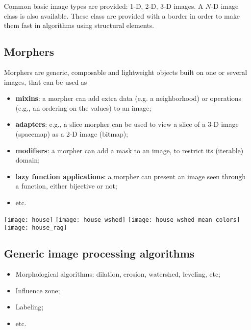 \documentclass{article}
\begin{document}
Common basic image types are provided: 1-D, 2-D, 3-D images.
A $N$-D image class is also available.
These class are provided with a border in order to make them fast in algorithms
using structural elements.

\subsection{Morphers}

Morphers are generic, composable and lightweight objects built on one or several
images, that can be used as
\begin{itemize}
  \item \textbf{mixins}: a morpher can add extra data (e.g. a neighborhood) or
	operations (e.g., an ordering on the values) to an image;
  \item \textbf{adapters}: e.g., a slice morpher can be used to view a slice of
	a 3-D image (spacemap) as a 2-D image (bitmap);
  \item \textbf{modifiers}: a morpher can add a mask to an image, to restrict its
	(iterable) domain;
  \item \textbf{lazy function applications}: a morpher can present an image seen
        through a function, either bijective or not;
  \item etc.
\end{itemize}

\begin{center}
  \texttt{[image: house]}%
  \texttt{[image: house\_wshed]}%
  \texttt{[image: house\_wshed\_mean\_colors]}%
  \texttt{[image: house\_rag]}%
\end{center}

\subsection{Generic image processing algorithms}

\begin{itemize}
  \item Morphological algorithms: dilation, erosion, watershed, leveling, etc;
  \item Influence zone;
  \item Labeling;
  \item etc.
\end{itemize}
\end{document}
